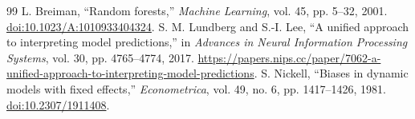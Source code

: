 \begin{thebibliography}{99}
 L. Breiman, ``Random forests,'' \textit{Machine Learning}, vol. 45, pp. 5--32, 2001. \href{https://doi.org/10.1023/A:1010933404324}{doi:10.1023/A:1010933404324}.
 S. M. Lundberg and S.-I. Lee, ``A unified approach to interpreting model predictions,'' in \textit{Advances in Neural Information Processing Systems}, vol. 30, pp. 4765--4774, 2017. \url{https://papers.nips.cc/paper/7062-a-unified-approach-to-interpreting-model-predictions}.
 S. Nickell, ``Biases in dynamic models with fixed effects,'' \textit{Econometrica}, vol. 49, no. 6, pp. 1417--1426, 1981. \href{https://doi.org/10.2307/1911408}{doi:10.2307/1911408}.
\end{thebibliography}
